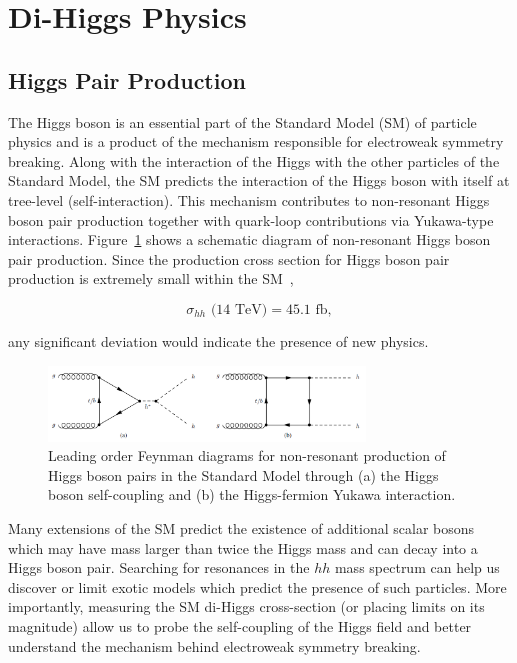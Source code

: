 \section{Di-Higgs Physics}
\subsection{Higgs Pair Production}
\label{sec:physics}

The Higgs boson is an essential part of the Standard Model (SM) of particle physics and is a product of the mechanism responsible for electroweak symmetry breaking. Along with the interaction of the Higgs with the other particles of the Standard Model, the SM predicts the interaction of the Higgs boson with itself at tree-level (self-interaction). This mechanism contributes to non-resonant Higgs boson pair production together with quark-loop contributions via Yukawa-type interactions. Figure~\ref{fig:nr_hh_production} shows a schematic diagram of non-resonant Higgs boson pair production. Since the production cross section for Higgs boson pair production is extremely small within the SM~\cite{deFlorian:2016spz}, 

\begin{equation*}
\sigma_{hh}\text{ (14 TeV)} = 45.1 \text{ fb},
\end{equation*}

any significant deviation would indicate the presence of new physics.

\begin{figure}[!h] 
\begin{center}
\includegraphics*[width=0.75\textwidth] {dihiggsPhys/figures/nr-diHiggs-production.png}
\caption{Leading order Feynman diagrams for non-resonant production of Higgs
  boson pairs in the Standard Model through (a) the Higgs boson self-coupling
  and (b) the Higgs-fermion Yukawa interaction.} 
  \label{fig:nr_hh_production}
\end{center}
\end{figure}

Many extensions of the SM predict the existence of additional scalar bosons which may have mass larger than twice the Higgs mass and can decay into a Higgs boson pair. Searching for resonances in the $hh$ mass spectrum can help us discover or limit exotic models which predict the presence of such particles. More importantly, measuring the SM di-Higgs cross-section (or placing limits on its magnitude) allow us to probe the self-coupling of the Higgs field and better understand the mechanism behind electroweak symmetry breaking.

